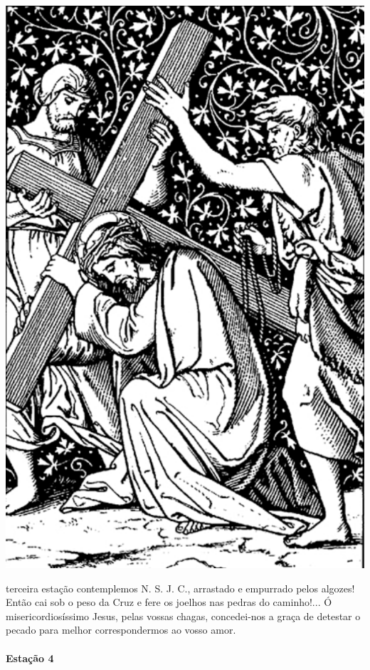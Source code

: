 \begin{nscenter}
\includegraphics[width=.8\textwidth, height=.8\textheight, keepaspectratio]{media/station3}
\end{nscenter}

 terceira estação contemplemos N. S. J. C., arrastado e empurrado pelos algozes! Então cai sob o peso da Cruz e fere os joelhos nas pedras do caminho!...
Ó misericordiosíssimo Jesus, pelas vossas chagas, concedei-nos a graça de detestar o pecado para melhor correspondermos ao vosso amor.

\newpage

\paragraph{Estação 4}

